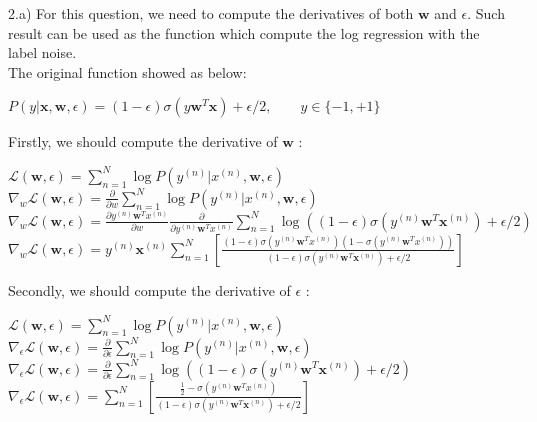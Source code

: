 \documentclass{article}
\begin{document}
2.a) For this question, we need to compute the derivatives of both $\textbf{w}$ and $\epsilon$. Such result can be used as the function which compute
the log regression with the label noise.\\
The original function showed as below:

\begin{center}
    $P(y|\textbf{x},\textbf{w},\epsilon) = (1-\epsilon)\sigma(y\textbf{w}^{T}\textbf{x})+\epsilon /2, \qquad y \in \{-1,+1\}$\\
 \end{center}

 Firstly, we should compute the derivative of $\textbf{w}$ :

\begin{center}
    $\mathcal{L}(\textbf{w},\epsilon) = \sum\limits_{n=1}^N \log P(y^{(n)}|x^{(n)},\textbf{w},\epsilon)$ \\ 
    $\nabla_{w}\mathcal{L}(\textbf{w},\epsilon) = \frac{\partial }{\partial w} \sum\limits_{n=1}^N \log P(y^{(n)}|x^{(n)},\textbf{w},\epsilon)$ \\
    $\nabla_{w}\mathcal{L}(\textbf{w},\epsilon) = \frac{\partial y^{(n)}\textbf{w}^{T}x^{(n)}}{\partial w} \frac{\partial }{\partial y^{(n)}\textbf{w}^{T}x^{(n)}} \sum\limits_{n=1}^N \log ((1-\epsilon)\sigma(y^{(n)}\textbf{w}^{T}\textbf{x}^{(n)})+\epsilon /2)$ \\
$\nabla_{w}\mathcal{L}(\textbf{w},\epsilon) = y^{(n)}\textbf{x}^{(n)} \sum\limits_{n=1}^N \left[ \frac{(1-\epsilon)\sigma(y^{(n)}\textbf{w}^{T}x^{(n)})(1-\sigma(y^{(n)}\textbf{w}^{T}x^{(n)}))}{(1-\epsilon)\sigma(y^{(n)}\textbf{w}^{T}\textbf{x}^{(n)})+\epsilon /2}\right]$
 \end{center}

 Secondly, we should compute the derivative of $\epsilon$ :

\begin{center}
    $\mathcal{L}(\textbf{w},\epsilon) = \sum\limits_{n=1}^N \log P(y^{(n)}|x^{(n)},\textbf{w},\epsilon)$ \\
    $\nabla_{\epsilon}\mathcal{L}(\textbf{w},\epsilon) = \frac{\partial }{\partial \epsilon} \sum\limits_{n=1}^N \log P(y^{(n)}|x^{(n)},\textbf{w},\epsilon)$ \\
    $\nabla_{\epsilon}\mathcal{L}(\textbf{w},\epsilon) = \frac{\partial }{\partial \epsilon} \sum\limits_{n=1}^N \log ((1-\epsilon)\sigma(y^{(n)}\textbf{w}^{T}\textbf{x}^{(n)})+\epsilon /2)$ \\
    $\nabla_{\epsilon}\mathcal{L}(\textbf{w},\epsilon) = \sum\limits_{n=1}^N \left[ \frac{\frac{1}{2}-\sigma(y^{(n)}\textbf{w}^{T}x^{(n)})}{(1-\epsilon)\sigma(y^{(n)}\textbf{w}^{T}\textbf{x}^{(n)})+\epsilon /2}\right]$
 \end{center}
\end{document}
